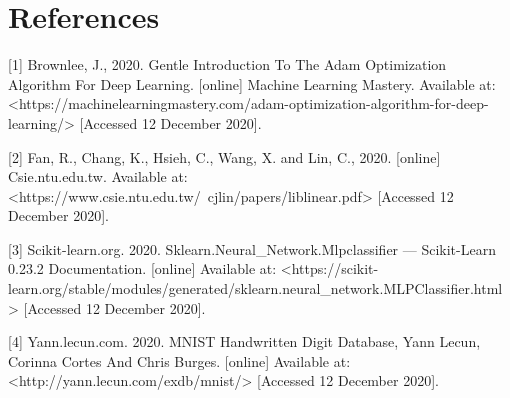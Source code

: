 \documentclass{article}
\begin{document}
\section*{References}
\small

[1] Brownlee, J., 2020. Gentle Introduction To The Adam Optimization Algorithm For Deep Learning. [online] Machine Learning Mastery. Available at: <https://machinelearningmastery.com/adam-optimization-algorithm-for-deep-learning/> [Accessed 12 December 2020].

[2] Fan, R., Chang, K., Hsieh, C., Wang, X. and Lin, C., 2020. [online] Csie.ntu.edu.tw. Available at: <https://www.csie.ntu.edu.tw/~cjlin/papers/liblinear.pdf> [Accessed 12 December 2020]. 

[3] Scikit-learn.org. 2020. Sklearn.Neural\_Network.Mlpclassifier — Scikit-Learn 0.23.2 Documentation. [online] Available at: <https://scikit-learn.org/stable/modules/generated/sklearn.neural\_network.MLPClassifier.html> [Accessed 12 December 2020].

[4] Yann.lecun.com. 2020. MNIST Handwritten Digit Database, Yann Lecun, Corinna Cortes And Chris Burges. [online] Available at: <http://yann.lecun.com/exdb/mnist/> [Accessed 12 December 2020].
\end{document}
